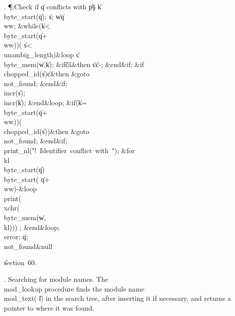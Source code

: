 . \P\?:Check if \|q conflicts with \|p\X\S\?\6
\|k\?\K\?\\{byte\_start}\?\1(\?\|q\?\2)\?;\5
\|s\?\K{};\5
\|w\?\K\?\|q\?\?\\{ww};\6
\1\&{while}\?\8\1(\?\|k\?<\?\\{byte\_start}\?\1(\?\|q\?+\?\\{ww}\?\2)\2)\W\1(\?%
\|s\?<\?\\{unambig\_length}\?\2)\?\8\&{loop}\6
\|c\?\K\?\\{byte\_mem}\?\1(\?\|w\?,\?\|k\?\2)\?;\6
\&{if}\1\1\8\|c\?\G\?\H{a}\2\8\&{then}\6
\|c\?\K\?\|c\?-\?;\2\6
\&{end}\8\2\&{if}\1;\6
\&{if}\1\1\8\\{chopped\_id}\?\1(\?\|s\?\2)\I\?\|c\2\8\&{then}\6
\&{goto}\8\\{not\_found};\2\6
\&{end}\8\2\&{if}\1;\6
\\{incr}\?\1(\?\|s\?\2)\?;\5
\\{incr}\?\1(\?\|k\?\2)\?;\2\6
\&{end}\8\&{loop};\6
\&{if}\1\1\?\8\1(\?\|k\?=\?\\{byte\_start}\?\1(\?\|q\?+\?\\{ww}\?\2)\2)\W\1(\?%
\\{chopped\_id}\?\1(\?\|s\?\2)\I{}\?\2)\?\2\8\&{then}\6
\&{goto}\8\\{not\_found};\2\6
\&{end}\8\2\&{if}\1;\6
\\{print\_nl}\?\1(\?\.{"!\ Identifier\ conflict\ with\ "}\?\2)\?;\6
\1\&{for}\8\\{kl}\?\in\?\\{byte\_start}\?\1(\?\|q\?\2)\to\?\\{byte\_start}\?\1(%
\?\|q\?+\?\\{ww}\?\2)-\8\&{loop}\6
\\{print}\?\1(\?\\{xchr}\?\1(\?\\{byte\_mem}\?\1(\?\|w\?,\?\\{kl}\?\2)\2)\2)%
\?;\2\6
\&{end}\8\&{loop};\6
\\{error};\5
\|q\?\K{};\6
\4\BL\\{not\_found}\EL\8\&{null}\par
\U section~60.\fi

.  Searching for module names.
The \\{mod\_lookup} procedure finds the module name \\{mod\_text}\?(\?\to\?%
\|l\?)\? in the
search tree, after inserting it if necessary, and returns a pointer to
where it was found.

